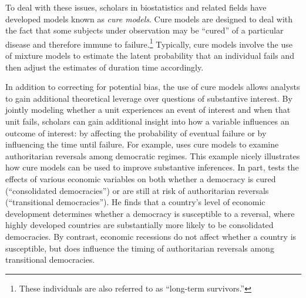 \documentclass[letterpaper, 12pt]{article}
\theoremstyle{plain}
\begin{document}
To deal with these issues, scholars in biostatistics and related fields have developed models known as \textit{cure models}. Cure models are designed to deal with the fact that some subjects under observation may be ``cured'' of a particular disease and therefore immune to failure.\footnote{These individuals are also referred to as ``long-term survivors.''} Typically, cure models involve the use of mixture models to estimate the latent probability that an individual fails and then adjust the estimates of duration time accordingly. 

In addition to correcting for potential bias, the use of cure models allows analysts to gain additional theoretical leverage over questions of substantive interest. By jointly modeling whether a unit experiences an event of interest and when that unit fails, scholars can gain additional insight into how a variable influences an outcome of interest: by affecting the probability of eventual failure or by influencing the time until failure.
For example, \citep{svolik2008} uses cure models to examine authoritarian reversals among democratic regimes. This example nicely illustrates how cure models can be used to improve substantive inferences. In part, \citep{svolik2008} tests the effects of various economic variables on both whether a democracy is cured (``consolidated democracies'') or are still at risk of authoritarian reversals (``transitional democracies''). He finds that a country's level of economic development determines whether a democracy is susceptible to a reversal, where highly developed countries are substantially more likely to be consolidated democracies. By contrast, economic recessions do not affect whether a country is susceptible, but does influence the timing of authoritarian reversals among transitional democracies. 
\end{document}
